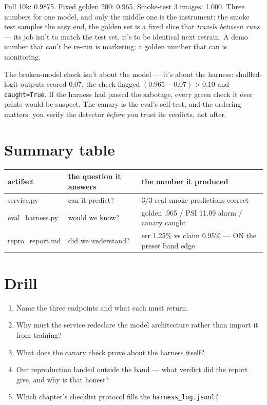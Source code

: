 \begin{example}
\label{ex:sampling}
Full 10k: 0.9875. Fixed golden 200: 0.965. Smoke-test 3 images:
1.000. Three numbers for one model, and only the middle one is the
instrument: the smoke test samples the easy end, the golden set is a
fixed slice that \emph{travels between runs} --- its job isn't to
match the test set, it's to be identical next retrain. A demo number
that can't be re-run is marketing; a golden number that can is
monitoring.
\end{example}
\begin{example}
\label{ex:canaryproof}
The broken-model check isn't about the model --- it's about the
harness: shuffled-logit outputs scored 0.07, the check flagged
$(0.965-0.07)>0.10$ and \texttt{caught=True}. If the harness had
passed the sabotage, every green check it ever prints would be
suspect. The canary is the eval's self-test, and the ordering
matters: you verify the detector \emph{before} you trust its
verdicts, not after.
\end{example}

\section{Summary table}
\label{sec:capsummary}

\begin{center}\small
\begin{tabular}{p{3.0cm}p{4.5cm}p{4.5cm}}
\toprule
artifact & the question it answers & the number it produced \\
\midrule
service.py & can it predict? & 3/3 real smoke predictions correct \\
eval\_harness.py & would we know? & golden .965 / PSI 11.09 alarm / canary caught \\
repro\_report.md & did we understand? & err 1.25\% vs claim 0.95\% --- ON the preset band edge \\
\bottomrule
\end{tabular}
\end{center}

\section*{Drill}
\begin{enumerate}
\item Name the three endpoints and what each must return.
\item Why must the service redeclare the model architecture rather
than import it from training?
\item What does the canary check prove about the harness itself?
\item Our reproduction landed outside the band --- what verdict
did the report give, and why is that honest?
\item Which chapter's checklist protocol fills the
\texttt{harness\_log.jsonl}?
\end{enumerate}

